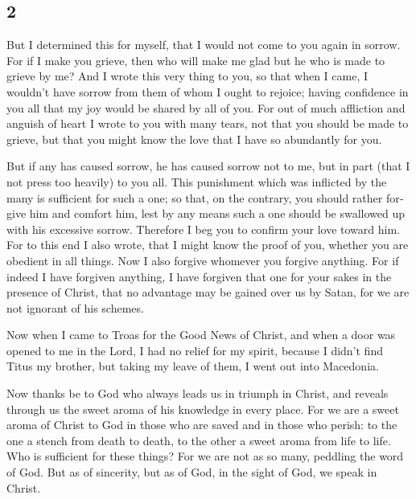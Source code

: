 \begin{paracol}{2}
\switchcolumn
\begin{otherlanguage}{english}

\hypertarget{section-3}{%
\section{2}\label{section-3}}

 But I determined this for myself, that I would not come
to you again in sorrow.  For if I make you grieve, then
who will make me glad but he who is made to grieve by me? 
And I wrote this very thing to you, so that when I came, I wouldn't have
sorrow from them of whom I ought to rejoice; having confidence in you
all that my joy would be shared by all of you.  For out of
much affliction and anguish of heart I wrote to you with many tears, not
that you should be made to grieve, but that you might know the love that
I have so abundantly for you.

 But if any has caused sorrow, he has caused sorrow not to
me, but in part (that I not press too heavily) to you all.
 This punishment which was inflicted by the many is
sufficient for such a one;  so that, on the contrary, you
should rather forgive him and comfort him, lest by any means such a one
should be swallowed up with his excessive sorrow. 
Therefore I beg you to confirm your love toward him.  For
to this end I also wrote, that I might know the proof of you, whether
you are obedient in all things.  Now I also forgive
whomever you forgive anything. For if indeed I have forgiven anything, I
have forgiven that one for your sakes in the presence of Christ,
 that no advantage may be gained over us by Satan, for we
are not ignorant of his schemes.

 Now when I came to Troas for the Good News of Christ,
and when a door was opened to me in the Lord,  I had no
relief for my spirit, because I didn't find Titus my brother, but taking
my leave of them, I went out into Macedonia.

 Now thanks be to God who always leads us in triumph in
Christ, and reveals through us the sweet aroma of his knowledge in every
place.  For we are a sweet aroma of Christ to God in
those who are saved and in those who perish:  to the one
a stench from death to death, to the other a sweet aroma from life to
life. Who is sufficient for these things?  For we are not
as so many, peddling the word of God. But as of sincerity, but as of
God, in the sight of God, we speak in Christ.


\end{otherlanguage}
\end{paracol}
